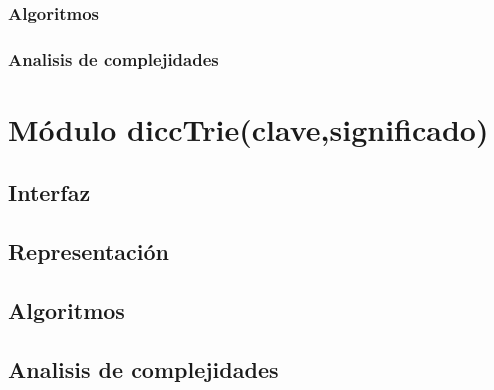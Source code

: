 \documentclass[12pt, a4paper]{article}
\begin{document}
\subsubsection{Algoritmos}

\subsubsection{Analisis de complejidades}

\newpage 
\section{M\'odulo diccTrie(clave,significado)}
\subsection{Interfaz}

\subsection{Representaci\'on}

\subsection{Algoritmos}

\subsection{Analisis de complejidades}

\newpage
\end{document}
